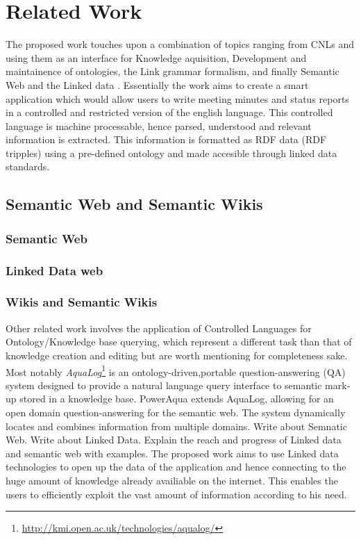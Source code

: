 \chapter{Related Work}

The proposed work touches upon a combination of topics ranging from CNLs and using them as an interface for Knowledge aquisition, Development and maintainence of ontologies,  the Link grammar formalism, and finally Semantic Web and the Linked data . Essentially the work aims to create a smart application which would allow users to write meeting minutes and status reports in a controlled and restricted version of the english language. This controlled language is machine processable, hence parsed, understood and relevant information is extracted. This information is formatted as RDF data (RDF tripples) using a pre-defined ontology and made accesible through linked data standards.

\section{Semantic Web and Semantic Wikis}



\subsection{Semantic Web}
\subsection{Linked Data web}
\subsection{Wikis and Semantic Wikis}

Other related work involves the application of Controlled Languages
for Ontology/Knowledge base querying, which represent a different task
than that of knowledge creation and editing but are worth mentioning
for completeness sake. Most notably
\emph{AquaLog}\footnote{\url{http://kmi.open.ac.uk/technologies/aqualog/}}
is an ontology-driven,portable question-answering (QA) system designed
to provide a natural language query interface to semantic mark-up
stored in a knowledge base. PowerAqua \cite{LopezMU06} extends
AquaLog, allowing for an open domain question-answering for the
semantic web. The system dynamically locates and combines information
from multiple domains.
Write about Semnatic Web. Write about Linked Data. Explain the reach and progress of Linked data and semantic web with examples. 
The proposed work aims to use Linked data technologies to open up the data of the application and hence connecting to the huge amount of knowledge already availiable on the internet. This enables the users to efficiently exploit the vast amount of information  according to his need.  


